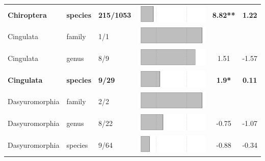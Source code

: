 \begin{longtable}{lL{1.8cm}C{2cm}lcc}
  \textbf{Chiroptera} & \textbf{species} & \textbf{215/1053} & \includegraphics[width=0.20\linewidth, height=0.05\linewidth]{Supplementaries/Figures/MissingMammals/Results_1c/Table_figures/bar12.pdf} & \textbf{8.82**} & \textbf{1.22} \\ 
  Cingulata & family & 1/1 & \includegraphics[width=0.20\linewidth, height=0.05\linewidth]{Supplementaries/Figures/MissingMammals/Results_1c/Table_figures/bar13.pdf} &   &   \\ 
  Cingulata & genus & 8/9 & \includegraphics[width=0.20\linewidth, height=0.05\linewidth]{Supplementaries/Figures/MissingMammals/Results_1c/Table_figures/bar14.pdf} & 1.51 & -1.57 \\ 
  \textbf{Cingulata} & \textbf{species} & \textbf{9/29} & \includegraphics[width=0.20\linewidth, height=0.05\linewidth]{Supplementaries/Figures/MissingMammals/Results_1c/Table_figures/bar15.pdf} & \textbf{1.9*} & \textbf{0.11} \\ 
  Dasyuromorphia & family & 2/2 & \includegraphics[width=0.20\linewidth, height=0.05\linewidth]{Supplementaries/Figures/MissingMammals/Results_1c/Table_figures/bar16.pdf} &   &   \\ 
  Dasyuromorphia & genus & 8/22 & \includegraphics[width=0.20\linewidth, height=0.05\linewidth]{Supplementaries/Figures/MissingMammals/Results_1c/Table_figures/bar17.pdf} & -0.75 & -1.07 \\ 
  Dasyuromorphia & species & 9/64 & \includegraphics[width=0.20\linewidth, height=0.05\linewidth]{Supplementaries/Figures/MissingMammals/Results_1c/Table_figures/bar18.pdf} & -0.88 & -0.34 \\ 

\end{longtable}
